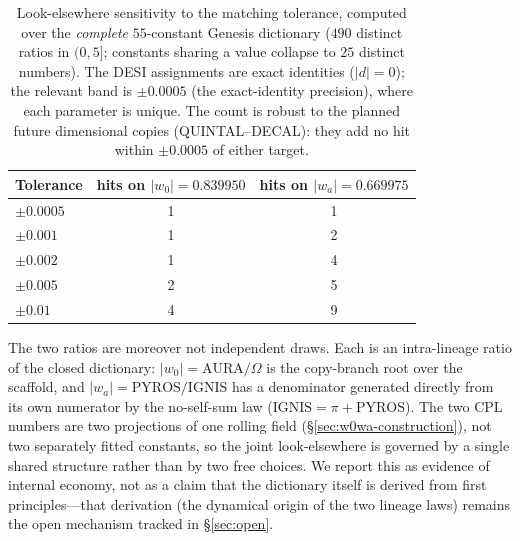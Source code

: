 \documentclass[aps,prd,preprint,amsmath,amssymb,nofootinbib,longbibliography]{revtex4-2}
\begin{document}
\begin{table}[ht]
\centering
\caption{Look-elsewhere sensitivity to the matching tolerance, computed over the
\emph{complete} $55$-constant Genesis dictionary ($490$ distinct ratios in
$(0,5]$; constants sharing a value collapse to $25$ distinct
numbers). The DESI assignments are exact identities ($|d|=0$); the relevant band is
$\pm0.0005$ (the exact-identity precision), where each parameter is unique. The count is
robust to the planned future dimensional copies (QUINTAL--DECAL): they add no hit
within $\pm0.0005$ of either target.}
\label{tab:lookelsewhere-tol}
\begin{tabular}{lcc}
\toprule
Tolerance & hits on $|w_0|=0.839950$ & hits on $|w_a|=0.669975$ \\
\midrule
$\pm0.0005$ & 1 & 1 \\
$\pm0.001$  & 1 & 2 \\
$\pm0.002$  & 1 & 4 \\
$\pm0.005$  & 2 & 5 \\
$\pm0.01$   & 4 & 9 \\
\bottomrule
\end{tabular}
\end{table}

The two ratios are moreover not independent draws. Each is an intra-lineage
ratio of the closed dictionary: $|w_0|=\mathrm{AURA}/\Omega$ is the copy-branch
root over the scaffold, and $|w_a|=\mathrm{PYROS}/\mathrm{IGNIS}$ has a
denominator generated directly from its own numerator by the no-self-sum law
($\mathrm{IGNIS}=\pi+\mathrm{PYROS}$). The two CPL numbers are
two projections of one rolling field (\S\ref{sec:w0wa-construction}), not two
separately fitted constants, so the joint look-elsewhere is governed by a
single shared structure rather than by two free choices. We report this as
evidence of internal economy, not as a claim that the dictionary itself is
derived from first principles---that derivation (the dynamical origin of the
two lineage laws) remains the open mechanism tracked in \S\ref{sec:open}.
\end{document}
